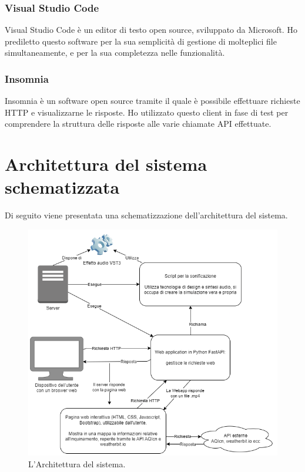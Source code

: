 \subsubsection{Visual Studio Code}
Visual Studio Code è un editor di testo open source, sviluppato da Microsoft.
Ho prediletto questo software per la sua semplicità di gestione di molteplici file simultaneamente, e per la sua completezza nelle funzionalità.
\subsubsection{Insomnia}
Insomnia è un software open source tramite il quale è possibile effettuare richieste HTTP e visualizzarne le risposte.
Ho utilizzato questo client in fase di test per comprendere la struttura delle risposte alle varie chiamate API effettuate.

\newpage
\section{Architettura del sistema schematizzata}
Di seguito viene presentata una schematizzazione dell'architettura del sistema.
\begin{figure}[H]
    \includegraphics[width=\linewidth]{img/uml.png}
    \caption{L'Architettura del sistema.}
    \label{fig:uml}
\end{figure}